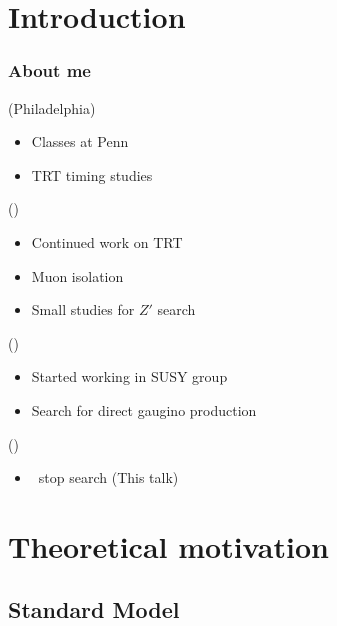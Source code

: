 \documentclass[10pt, svgnames]{beamer}
\begin{document}
\section*{Introduction}

\begin{frame}
  \frametitle{About me}
  \begin{description}[0ex]
    \item[2008-2010] (Philadelphia) \\
      \begin{itemize}
        \item Classes at Penn
        \item TRT timing studies
      \end{itemize}
    \item[2010-2012] (\cern) \\
      \begin{itemize}
        \item Continued work on TRT
        \item Muon isolation
        \item Small studies for $Z'$ search
      \end{itemize}
    \item[2012-2013] (\cern) \\
      \begin{itemize}
        \item Started working in SUSY group
        \item Search for direct gaugino production
      \end{itemize}
    \item[2013-2015] (\cern) \\
      \begin{itemize}
        \item \BMINUSL\ stop search (This talk)
      \end{itemize}
  \end{description}
\end{frame}

\section{Theoretical motivation}
\subsection{Standard Model}
\end{document}
